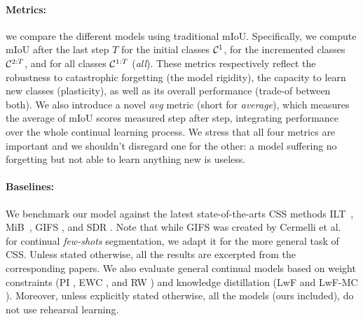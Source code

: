 \paragraph{Metrics:\,} we compare the different models using traditional \acf{mIoU}.
Specifically, we compute \ac{mIoU} after the last step $T$ for the initial classes $\mathcal{C}^{1}$, for
the incremented classes $\mathcal{C}^{2:T}$, and for all classes $\mathcal{C}^{1:T}$ (\textit{all}). These metrics
respectively reflect the robustness to catastrophic forgetting (the model rigidity), the capacity to
learn new classes (plasticity), as well as its overall performance (trade-of between both). We also
introduce a novel \textit{avg} metric (short for \textit{average}), which measures the average of
\ac{mIoU} scores measured step after step, integrating performance over the whole continual learning
process. We stress that all four metrics are important and we shouldn't disregard one for the other:
a model suffering no forgetting but not able to learn anything new is useless.



\paragraph{Baselines:\,} We benchmark our model against the latest state-of-the-arts \ac{CSS}
methods ILT~\cite{michieli2019ilt}, MiB~\cite{cermelli2020modelingthebackground}, GIFS
\cite{cermelli2020fewshotcontinualsegm}, and SDR \cite{michieli2021sdr}. Note that while GIFS was
created by Cermelli et al.~\cite{cermelli2020fewshotcontinualsegm} for continual \textit{few-shots}
segmentation, we adapt it for the more general task of \ac{CSS}. Unless stated otherwise, all the results
are excerpted from the corresponding papers. We also evaluate general continual models based on
weight constraints (PI \cite{zenke2017synaptic_intelligence}, EWC \cite{kirkpatrick2017ewc}, and RW
\cite{chaudhry2018riemannien_walk}) and knowledge distillation (LwF \cite{li2018lwf} and LwF-MC
\cite{rebuffi2017icarl}). Moreover, unless explicitly stated otherwise, all the models (ours
included), do not use rehearsal learning.


